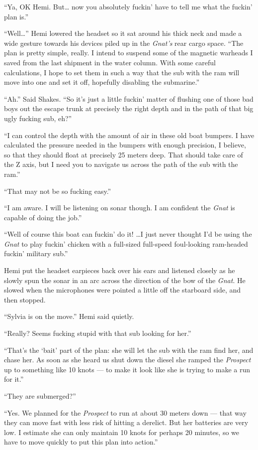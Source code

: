 \documentclass[]{scrbook}
\begin{document}
``Ya, OK Hemi. But\ldots{} now you absolutely fuckin' have to tell me
what the fuckin' plan is.''

``Well\ldots{}'' Hemi lowered the headset so it sat around his thick
neck and made a wide gesture towards his devices piled up in the
\emph{Gnat's} rear cargo space. ``The plan is pretty simple, really. I
intend to suspend some of the magnetic warheads I saved from the last
shipment in the water column. With some careful calculations, I hope to
set them in such a way that the sub with the ram will move into one and
set it off, hopefully disabling the submarine.''

``Ah.'' Said Shakes. ``So it's just a little fuckin' matter of flushing
one of those bad boys out the escape trunk at precisely the right depth
and in the path of that big ugly fucking sub, eh?''

``I can control the depth with the amount of air in these old boat
bumpers. I have calculated the pressure needed in the bumpers with
enough precision, I believe, so that they should float at precisely 25
meters deep. That should take care of the Z axis, but I need you to
navigate us across the path of the sub with the ram.''

``That may not be so fucking easy.''

``I am aware. I will be listening on sonar though. I am confident the
\emph{Gnat} is capable of doing the job.''

``Well of course this boat can fuckin' do it! \ldots{}I just never
thought I'd be using the \emph{Gnat} to play fuckin' chicken with a
full-sized full-speed foul-looking ram-headed fuckin' military sub.''

Hemi put the headset earpieces back over his ears and listened closely
as he slowly spun the sonar in an arc across the direction of the bow of
the \emph{Gnat}. He slowed when the microphones were pointed a little
off the starboard side, and then stopped.

``Sylvia is on the move.'' Hemi said quietly.

``Really? Seems fucking stupid with that sub looking for her.''

``That's the `bait' part of the plan: she will let the sub with the ram
find her, and chase her. As soon as she heard us shut down the diesel
she ramped the \emph{Prospect} up to something like 10 knots --- to make
it look like she is trying to make a run for it.''

``They are submerged?''

``Yes. We planned for the \emph{Prospect} to run at about 30 meters down
--- that way they can move fast with less risk of hitting a derelict.
But her batteries are very low. I estimate she can only maintain 10
knots for perhaps 20 minutes, so we have to move quickly to put this
plan into action.''
\end{document}
